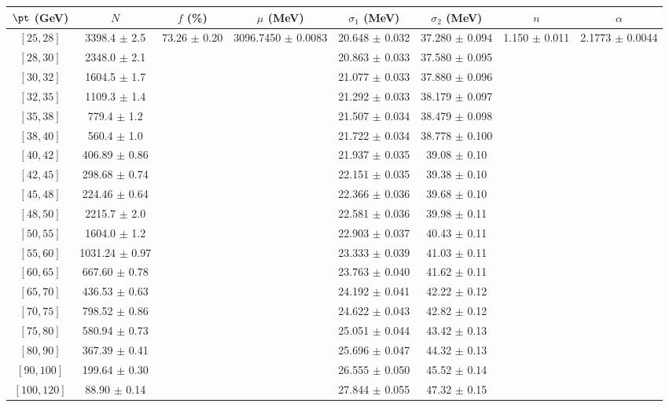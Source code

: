 \begin{tabular}{c||c|c|c|c|c|c|c}
$\pt$ (GeV) & $N$ & $f$ (\%) & $\mu$ (MeV) & $\sigma_1$ (MeV) & $\sigma_2$ (MeV) & $n$ & $\alpha$ \\
\hline
$[25, 28]$ & 3398.4 $\pm$ 2.5 & \multirow{19}{*}{73.26 $\pm$ 0.20} & \multirow{19}{*}{3096.7450 $\pm$ 0.0083} & 20.648 $\pm$ 0.032 & 37.280 $\pm$ 0.094 & \multirow{19}{*}{1.150 $\pm$ 0.011} & \multirow{19}{*}{2.1773 $\pm$ 0.0044}\\
$[28, 30]$ & 2348.0 $\pm$ 2.1 &  &  & 20.863 $\pm$ 0.033 & 37.580 $\pm$ 0.095 &  & \\
$[30, 32]$ & 1604.5 $\pm$ 1.7 &  &  & 21.077 $\pm$ 0.033 & 37.880 $\pm$ 0.096 &  & \\
$[32, 35]$ & 1109.3 $\pm$ 1.4 &  &  & 21.292 $\pm$ 0.033 & 38.179 $\pm$ 0.097 &  & \\
$[35, 38]$ & 779.4 $\pm$ 1.2 &  &  & 21.507 $\pm$ 0.034 & 38.479 $\pm$ 0.098 &  & \\
$[38, 40]$ & 560.4 $\pm$ 1.0 &  &  & 21.722 $\pm$ 0.034 & 38.778 $\pm$ 0.100 &  & \\
$[40, 42]$ & 406.89 $\pm$ 0.86 &  &  & 21.937 $\pm$ 0.035 & 39.08 $\pm$ 0.10 &  & \\
$[42, 45]$ & 298.68 $\pm$ 0.74 &  &  & 22.151 $\pm$ 0.035 & 39.38 $\pm$ 0.10 &  & \\
$[45, 48]$ & 224.46 $\pm$ 0.64 &  &  & 22.366 $\pm$ 0.036 & 39.68 $\pm$ 0.10 &  & \\
$[48, 50]$ & 2215.7 $\pm$ 2.0 &  &  & 22.581 $\pm$ 0.036 & 39.98 $\pm$ 0.11 &  & \\
$[50, 55]$ & 1604.0 $\pm$ 1.2 &  &  & 22.903 $\pm$ 0.037 & 40.43 $\pm$ 0.11 &  & \\
$[55, 60]$ & 1031.24 $\pm$ 0.97 &  &  & 23.333 $\pm$ 0.039 & 41.03 $\pm$ 0.11 &  & \\
$[60, 65]$ & 667.60 $\pm$ 0.78 &  &  & 23.763 $\pm$ 0.040 & 41.62 $\pm$ 0.11 &  & \\
$[65, 70]$ & 436.53 $\pm$ 0.63 &  &  & 24.192 $\pm$ 0.041 & 42.22 $\pm$ 0.12 &  & \\
$[70, 75]$ & 798.52 $\pm$ 0.86 &  &  & 24.622 $\pm$ 0.043 & 42.82 $\pm$ 0.12 &  & \\
$[75, 80]$ & 580.94 $\pm$ 0.73 &  &  & 25.051 $\pm$ 0.044 & 43.42 $\pm$ 0.13 &  & \\
$[80, 90]$ & 367.39 $\pm$ 0.41 &  &  & 25.696 $\pm$ 0.047 & 44.32 $\pm$ 0.13 &  & \\
$[90, 100]$ & 199.64 $\pm$ 0.30 &  &  & 26.555 $\pm$ 0.050 & 45.52 $\pm$ 0.14 &  & \\
$[100, 120]$ & 88.90 $\pm$ 0.14 &  &  & 27.844 $\pm$ 0.055 & 47.32 $\pm$ 0.15 &  & \\
\end{tabular}
